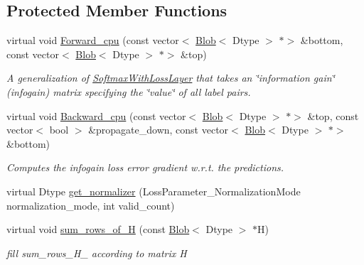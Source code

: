 \subsection*{Protected Member Functions}
\begin{DoxyCompactItemize}
\item 
virtual void \mbox{\hyperlink{classcaffe_1_1_infogain_loss_layer_a134b51c126eb4b62fac804965f8d8327}{Forward\+\_\+cpu}} (const vector$<$ \mbox{\hyperlink{classcaffe_1_1_blob}{Blob}}$<$ Dtype $>$ $\ast$$>$ \&bottom, const vector$<$ \mbox{\hyperlink{classcaffe_1_1_blob}{Blob}}$<$ Dtype $>$ $\ast$$>$ \&top)
\begin{DoxyCompactList}\small\item\em A generalization of \mbox{\hyperlink{classcaffe_1_1_softmax_with_loss_layer}{Softmax\+With\+Loss\+Layer}} that takes an \char`\"{}information gain\char`\"{} (infogain) matrix specifying the \char`\"{}value\char`\"{} of all label pairs. \end{DoxyCompactList}\item 
virtual void \mbox{\hyperlink{classcaffe_1_1_infogain_loss_layer_a6d8fc17daa7233fb96629b641fbc46ac}{Backward\+\_\+cpu}} (const vector$<$ \mbox{\hyperlink{classcaffe_1_1_blob}{Blob}}$<$ Dtype $>$ $\ast$$>$ \&top, const vector$<$ bool $>$ \&propagate\+\_\+down, const vector$<$ \mbox{\hyperlink{classcaffe_1_1_blob}{Blob}}$<$ Dtype $>$ $\ast$$>$ \&bottom)
\begin{DoxyCompactList}\small\item\em Computes the infogain loss error gradient w.\+r.\+t. the predictions. \end{DoxyCompactList}\item 
virtual Dtype \mbox{\hyperlink{classcaffe_1_1_infogain_loss_layer_a0e5e9667b19fb88ece7298e3e83d2fdb}{get\+\_\+normalizer}} (Loss\+Parameter\+\_\+\+Normalization\+Mode normalization\+\_\+mode, int valid\+\_\+count)
\item 
\mbox{\label{classcaffe_1_1_infogain_loss_layer_a030296e6af30acd17a3cfe4463456147}} 
virtual void \mbox{\hyperlink{classcaffe_1_1_infogain_loss_layer_a030296e6af30acd17a3cfe4463456147}{sum\+\_\+rows\+\_\+of\+\_\+H}} (const \mbox{\hyperlink{classcaffe_1_1_blob}{Blob}}$<$ Dtype $>$ $\ast$H)
\begin{DoxyCompactList}\small\item\em fill sum\+\_\+rows\+\_\+\+H\+\_\+ according to matrix H \end{DoxyCompactList}\item 

\end{DoxyCompactItemize}
